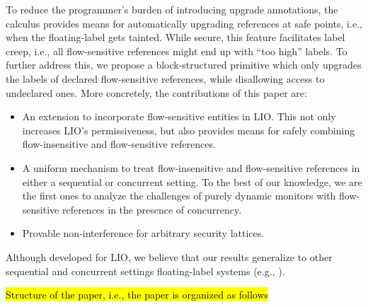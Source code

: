 To reduce the programmer's burden of
introducing upgrade annotations, the calculus provides means for automatically
upgrading references at safe points, i.e., when the floating-label gets tainted.
While secure, this feature facilitates label creep, i.e., all flow-sensitive
references might end up with ``too high'' labels. To further address this, we propose a
block-structured primitive which only upgrades the labels of declared
flow-sensitive references, while disallowing access to undeclared ones.
More concretely, the contributions of this paper are:
\begin{itemize}

\item An extension to incorporate flow-sensitive entities in LIO. This
  not only increases LIO's permissiveness, but also provides means for safely
  combining flow-insensitive and flow-sensitive references.

\item A uniform mechanism to treat flow-insensitive and flow-sensitive
  references in either a sequential or concurrent setting. To the best of our
  knowledge, we are the first ones to analyze the challenges of purely dynamic
  monitors with flow-sensitive references in the presence of concurrency.

\item Provable non-interference for arbitrary security lattices.

\end{itemize}
%
Although developed for LIO, we believe that our results generalize to other
sequential and concurrent settings floating-label systems (e.g.,
\cite{10.1109/SP.2013.10, Efstathopoulos:2005, zeldovich:histar, krohn:flume}).

\hl{Structure of the paper, i.e., the paper is organized as follows}
